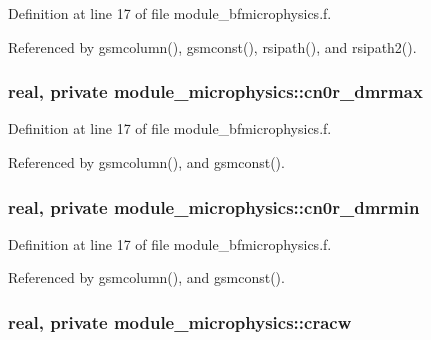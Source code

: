 Definition at line 17 of file module\+\_\+bfmicrophysics.\+f.



Referenced by gsmcolumn(), gsmconst(), rsipath(), and rsipath2().

\subsubsection[{\texorpdfstring{cn0r\+\_\+dmrmax}{cn0r_dmrmax}}]{\setlength{\rightskip}{0pt plus 5cm}real, private module\+\_\+microphysics\+::cn0r\+\_\+dmrmax\hspace{0.3cm}{\ttfamily [private]}}\hypertarget{namespacemodule__microphysics_a3757ff5b4210247ec04e08537dfa9696}{}\label{namespacemodule__microphysics_a3757ff5b4210247ec04e08537dfa9696}


Definition at line 17 of file module\+\_\+bfmicrophysics.\+f.



Referenced by gsmcolumn(), and gsmconst().

\subsubsection[{\texorpdfstring{cn0r\+\_\+dmrmin}{cn0r_dmrmin}}]{\setlength{\rightskip}{0pt plus 5cm}real, private module\+\_\+microphysics\+::cn0r\+\_\+dmrmin\hspace{0.3cm}{\ttfamily [private]}}\hypertarget{namespacemodule__microphysics_abd42b2566e31b5d29c6f69471cb3ec5d}{}\label{namespacemodule__microphysics_abd42b2566e31b5d29c6f69471cb3ec5d}


Definition at line 17 of file module\+\_\+bfmicrophysics.\+f.



Referenced by gsmcolumn(), and gsmconst().

\subsubsection[{\texorpdfstring{cracw}{cracw}}]{\setlength{\rightskip}{0pt plus 5cm}real, private module\+\_\+microphysics\+::cracw\hspace{0.3cm}{\ttfamily [private]}}\hypertarget{namespacemodule__microphysics_ac2d7886b9a3b896fbfdce0e3bf3b805a}{}\label{namespacemodule__microphysics_ac2d7886b9a3b896fbfdce0e3bf3b805a}


